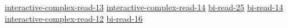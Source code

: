 \hyperref[sec:interactive-complex-read-13]{interactive-complex-read-13}
\hyperref[sec:interactive-complex-read-14]{interactive-complex-read-14}
\hyperref[sec:bi-read-25]{bi-read-25}
\hyperref[sec:bi-read-14]{bi-read-14}
\hyperref[sec:interactive-complex-read-12]{interactive-complex-read-12}
\hyperref[sec:bi-read-16]{bi-read-16}
